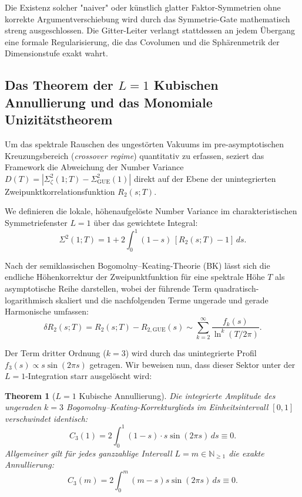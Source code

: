 \documentclass[11pt,a4paper]{article}
\newtheorem{theorem}{Theorem}[section]
\theoremstyle{definition}
\begin{document}
	Die Existenz solcher "naiver" oder künstlich glatter Faktor-Symmetrien ohne korrekte Argumentverschiebung wird durch das Symmetrie-Gate mathematisch streng ausgeschlossen. Die Gitter-Leiter verlangt stattdessen an jedem Übergang eine formale Regularisierung, die das Covolumen und die Sphärenmetrik der Dimensionstufe exakt wahrt.
	
	\subsection{Das Theorem der $L=1$ Kubischen Annullierung und das Monomiale Unizitätstheorem}
	\label{sec:r2_c3_annihilation}
	
	Um das spektrale Rauschen des ungestörten Vakuums im pre-asymptotischen Kreuzungsbereich (\emph{crossover regime}) quantitativ zu erfassen, seziert das Framework die Abweichung der Number Variance $D(T) = \left|\Sigma^2_\zeta(1;T) - \Sigma^2_{\mathrm{GUE}}(1)\right|$ direkt auf der Ebene der unintegrierten Zweipunktkorrelationsfunktion $R_2(s; T)$. 
	
	We definieren die lokale, höhenaufgelöste Number Variance im charakteristischen Symmetriefenster $L=1$ über das gewichtete Integral:
	\begin{equation}
		\Sigma^2(1; T) = 1 + 2\int_0^1 (1-s)\,[R_2(s; T) - 1]\,ds.
	\end{equation}
	
	Nach der semiklassischen Bogomolny--Keating-Theorie (BK) lässt sich die endliche Höhenkorrektur der Zweipunktfunktion für eine spektrale Höhe $T$ als asymptotische Reihe darstellen, wobei der führende Term quadratisch-logarithmisch skaliert und die nachfolgenden Terme ungerade und gerade Harmonische umfassen:
	\begin{equation}
		\delta R_2(s; T) = R_2(s; T) - R_{2,\mathrm{GUE}}(s) \sim \sum_{k=2}^{\infty} \frac{f_k(s)}{\ln^k(T/2\pi)}.
	\end{equation}
	
	Der Term dritter Ordnung ($k=3$) wird durch das unintegrierte Profil $f_3(s) \propto s \sin(2\pi s)$ getragen. Wir beweisen nun, dass dieser Sektor unter der $L=1$-Integration starr ausgelöscht wird:
	
	\begin{theorem}[$L=1$ Kubische Annullierung]
		\label{thm:c3_annihilate}
		Die integrierte Amplitude des ungeraden $k=3$ Bogomolny--Keating-Korrekturglieds im Einheitsintervall $[0,1]$ verschwindet identisch:
		\begin{equation}
			C_3(1) = 2 \int_0^1 (1-s) \cdot s \sin(2\pi s) \, ds \equiv 0.
		\end{equation}
		Allgemeiner gilt für jedes ganzzahlige Intervall $L = m \in \mathbb{N}_{\ge 1}$ die exakte Annullierung:
		\begin{equation}
			C_3(m) = 2 \int_0^m (m-s)s \sin(2\pi s) \, ds \equiv 0.
		\end{equation}
	\end{theorem}
	
\end{document}

